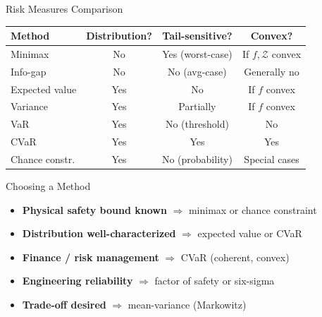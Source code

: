 \documentclass[aspectratio=169,10pt]{beamer}
\newcommand{\Z}{\mathcal{Z}}
\begin{document}
\begin{frame}[allowframebreaks]{Risk Measures Comparison}
  \begin{center}
  \begin{tabular}{lccc}
    \toprule
    \textbf{Method} & \textbf{Distribution?} & \textbf{Tail-sensitive?} & \textbf{Convex?}\\
    \midrule
    Minimax        & No  & Yes (worst-case) & If $f,\Z$ convex \\
    Info-gap       & No  & No (avg-case)    & Generally no \\
    Expected value & Yes & No               & If $f$ convex \\
    Variance       & Yes & Partially        & If $f$ convex \\
    VaR            & Yes & No (threshold)   & No \\
    CVaR           & Yes & Yes              & Yes \\
    Chance constr. & Yes & No (probability) & Special cases \\
    \bottomrule
  \end{tabular}
  \end{center}

  \framebreak

  \begin{block}{Choosing a Method}
    \begin{itemize}
      \item \textbf{Physical safety bound known} $\Rightarrow$ minimax or chance constraint
      \item \textbf{Distribution well-characterized} $\Rightarrow$ expected value or CVaR
      \item \textbf{Finance / risk management} $\Rightarrow$ CVaR (coherent, convex)
      \item \textbf{Engineering reliability} $\Rightarrow$ factor of safety or six-sigma
      \item \textbf{Trade-off desired} $\Rightarrow$ mean-variance (Markowitz)
    \end{itemize}
  \end{block}
\end{frame}
\end{document}
